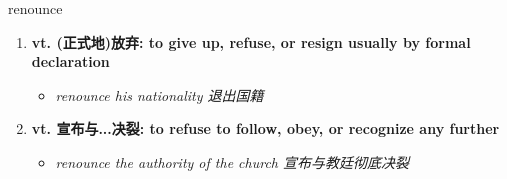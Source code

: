 
\begin{frame}
{\huge renounce}
\begin{center}
\begin{enumerate}\Large
  \item \textbf{vt. (正式地)放弃: to give up, refuse, or resign usually by formal declaration}
  \begin{itemize}
    \item \em{\Large{renounce his nationality 退出国籍}}
  \end{itemize}
  \item \textbf{vt. 宣布与...决裂: to refuse to follow, obey, or recognize any further}
  \begin{itemize}
    \item \em{\Large{renounce the authority of the church 宣布与教廷彻底决裂}}
  \end{itemize}
\end{enumerate}
\end{center}
\end{frame}
